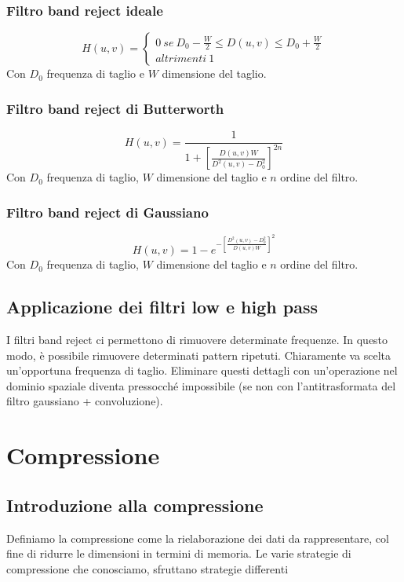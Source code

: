 \documentclass{report}
\begin{document}
	\subsection{Filtro band reject ideale}
	$$
	H(u,v) = \begin{cases}
	0 \ se \ D_0 - \frac{W}{2}\leq D(u,v) \leq D_0 + \frac{W}{2}\\
	altrimenti \ 1
	\end{cases}
	$$
	Con $D_0$ frequenza di taglio e $W$ dimensione del taglio.
	\subsection{Filtro band reject di Butterworth}
	$$
	H(u,v) = \frac{1}{1+\left[ \frac{D(u,v)W}{D^2(u,v)-D_0^2}\right]^{2n}}
	$$
	Con $D_0$ frequenza di taglio, $W$ dimensione del taglio e $n$ ordine del filtro.
	\subsection{Filtro band reject di Gaussiano}
	$$
	H(u,v) = 1-e^{-\left[ \frac{D^2(u,v)-D^2_0}{D(u,v)W}\right]^2}
	$$
	Con $D_0$ frequenza di taglio, $W$ dimensione del taglio e $n$ ordine del filtro.
	\section{Applicazione dei filtri low e high pass}
	I filtri band reject ci permettono di rimuovere determinate frequenze. In questo modo, è possibile rimuovere determinati pattern ripetuti. Chiaramente va scelta un'opportuna frequenza di taglio. Eliminare questi dettagli con un'operazione nel dominio spaziale diventa pressocché impossibile (se non con l'antitrasformata del filtro gaussiano + convoluzione).
	
	\chapter{Compressione}
	\section{Introduzione alla compressione}
	Definiamo la compressione come la rielaborazione dei dati da rappresentare, col fine di ridurre le dimensioni in termini di memoria. Le varie strategie di compressione che conosciamo, sfruttano strategie differenti
\end{document}
